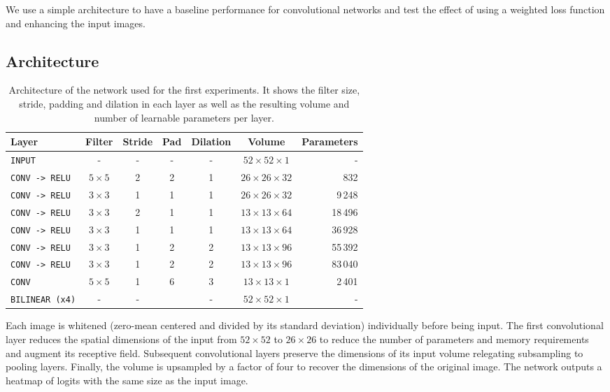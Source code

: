 We use a simple architecture to have a baseline performance for convolutional networks and test the effect of using a weighted loss function and enhancing the input images.

\subsection{Architecture}
\begin{table}[h!]
	\centering
	\begin{tabular}{lcccccr}
	\hline
	\textbf{Layer} & \textbf{Filter} & \textbf{Stride} & \textbf{Pad} & \textbf{Dilation} & \textbf{Volume} & \textbf{Parameters} \\
	\hline
	\texttt{INPUT}	&- & -	& - & - & $52 \times 52 \times 1$ & -\\
	\texttt{CONV -> RELU}	& $5 \times 5$ & 2 & 2 & 1 & $26 \times 26 \times 32$ & 832\\
	\texttt{CONV -> RELU}	& $3 \times 3$ & 1 & 1 & 1 & $26 \times 26 \times 32$ & 9\,248\\
	\texttt{CONV -> RELU}	& $3 \times 3$ & 2 & 1 & 1 & $13 \times 13 \times 64$ & 18\,496\\
	\texttt{CONV -> RELU}	& $3 \times 3$ & 1 & 1 & 1 & $13 \times 13 \times 64$ & 36\,928\\
	\texttt{CONV -> RELU}	& $3 \times 3$ & 1 & 2 & 2 & $13 \times 13 \times 96$ & 55\,392\\
	\texttt{CONV -> RELU}	& $3 \times 3$ & 1 & 2 & 2 & $13 \times 13 \times 96$ & 83\,040\\
	\texttt{CONV}			& $5 \times 5$ & 1 & 6 & 3 & $13 \times 13 \times 1$ & 2\,401\\
	\texttt{BILINEAR (x4)}	& - & - && - & $52 \times 52 \times 1$ & -\\
	\hline
	\end{tabular}
	\caption[Convolutional network architecture for Experiment 1]{Architecture of the network used for the first experiments. It shows the filter size, stride, padding and dilation in each layer as well as the resulting volume and number of learnable parameters per layer.}
	\label{tab:convNetArchitecture1}
\end{table} %

Each image is whitened (zero-mean centered and divided by its standard deviation) individually before being input. 
The first convolutional layer reduces the spatial dimensions of the input from $52 \times 52$ to $26 \times 26$ to reduce the number of parameters and memory requirements and augment its receptive field. Subsequent convolutional layers preserve the dimensions of its input volume relegating subsampling to pooling layers. 
Finally, the volume is upsampled by a factor of four to recover the dimensions of the original image. The network outputs a heatmap of logits with the same size as the input image.

